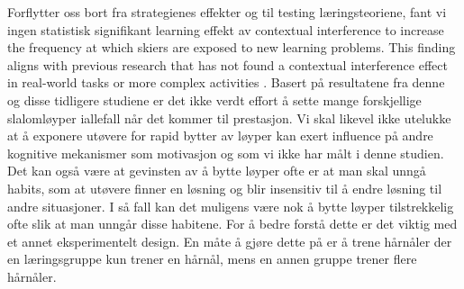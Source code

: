 Forflytter oss bort fra strategienes effekter og til testing læringsteoriene, fant vi ingen statistisk signifikant learning effekt av contextual interference to increase the frequency at which skiers are exposed to new learning problems. This finding aligns with previous research that has not found a contextual interference effect in real-world tasks or more complex activities \cite{brady_theoretical_1998, barreiros_contextual_2007, wulf_principles_2002}. Basert på resultatene fra denne og disse tidligere studiene er det ikke verdt effort å sette mange forskjellige slalomløyper iallefall når det kommer til prestasjon. Vi skal likevel ikke utelukke at å exponere utøvere for rapid bytter av løyper kan exert influence på andre kognitive mekanismer som motivasjon og som vi ikke har målt i denne studien. Det kan også være at gevinsten av å bytte løyper ofte er at man skal unngå habits, som at utøvere finner en løsning og blir insensitiv til å endre løsning til andre situasjoner. I så fall kan det muligens være nok å bytte løyper tilstrekkelig ofte slik at man unngår disse habitene. For å bedre forstå dette er det viktig med et annet eksperimentelt design. En måte å gjøre dette på er å trene hårnåler der en læringsgruppe kun trener en hårnål, mens en annen gruppe trener flere hårnåler. 















